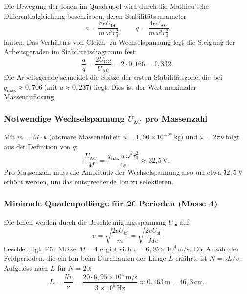 \documentclass{article}
\begin{document}
Die Bewegung der Ionen im Quadrupol wird durch die Mathieu'sche
Differentialgleichung beschrieben, deren Stabilitätsparameter
\begin{equation}
    a = \frac{8eU_{\mathrm{DC}}}{m\,\omega^2 r_0^2}, \qquad
    q = \frac{4eU_{\mathrm{AC}}}{m\,\omega^2 r_0^2}
\end{equation}
lauten. Das Verhältnis von Gleich- zu Wechselspannung legt die Steigung
der Arbeitsgeraden im Stabilitätsdiagramm fest:
\begin{equation}
    \frac{a}{q} = \frac{2U_{\mathrm{DC}}}{U_{\mathrm{AC}}}
    = 2 \cdot 0{,}166 = 0{,}332.
\end{equation}
Die Arbeitsgerade schneidet die Spitze der ersten Stabilitätszone, die
bei $q_{\mathrm{max}} \approx 0{,}706$ (mit $a \approx 0{,}237$) liegt.
Dies ist der Wert maximaler Massenauflösung.

\subsubsection*{Notwendige Wechselspannung $U_{\mathrm{AC}}$ pro Massenzahl}

Mit $m = M \cdot u$ (atomare Masseneinheit $u = 1{,}66 \times 10^{-27}\,
\mathrm{kg}$) und $\omega = 2\pi\nu$ folgt aus der Definition von $q$:
\begin{equation}
    \frac{U_{\mathrm{AC}}}{M}
    = \frac{q_{\mathrm{max}}\,u\,\omega^2 r_0^2}{4e}
    \approx 32{,}5\,\mathrm{V}.
\end{equation}
Pro Massenzahl muss die Amplitude der Wechselspannung also um etwa
$32{,}5\,\mathrm{V}$ erhöht werden, um das entsprechende Ion zu
selektieren.

\subsubsection*{Minimale Quadrupollänge für 20 Perioden (Masse 4)}

Die Ionen werden durch die Beschleunigungsspannung $U_{\mathrm{bi}}$ auf
\begin{equation}
    v = \sqrt{\frac{2eU_{\mathrm{bi}}}{m}}
      = \sqrt{\frac{2eU_{\mathrm{bi}}}{M u}}
\end{equation}
beschleunigt. Für Masse $M = 4$ ergibt sich
$v = 6{,}95 \times 10^{4}\,\mathrm{m/s}$.
Die Anzahl der Feldperioden, die ein Ion beim Durchlaufen der Länge $L$
erfährt, ist $N = \nu L / v$. Aufgelöst nach $L$ für $N = 20$:
\begin{equation}
    L = \frac{N v}{\nu}
      = \frac{20 \cdot 6{,}95 \times 10^4\,\mathrm{m/s}}{3 \times 10^6\,\mathrm{Hz}}
      \approx 0{,}463\,\mathrm{m} = 46{,}3\,\mathrm{cm}.
\end{equation}
\end{document}
